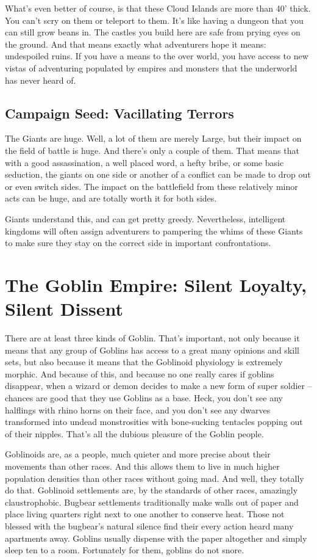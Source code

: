 What's even better of course, is that these Cloud Islands are more than 40' thick. You can't scry on them or teleport to them. It's like having a dungeon that you can still grow beans in. The castles you build here are safe from prying eyes on the ground. And that means exactly what adventurers hope it means: undespoiled ruins. If you have a means to the over world, you have access to new vistas of adventuring populated by empires and monsters that the underworld has never heard of.

\subsection{Campaign Seed: Vacillating Terrors}
The Giants are huge. Well, a lot of them are merely Large, but their impact on the field of battle is huge. And there's only a couple of them. That means that with a good assassination, a well placed word, a hefty bribe, or some basic seduction, the giants on one side or another of a conflict can be made to drop out or even switch sides. The impact on the battlefield from these relatively minor acts can be huge, and are totally worth it for both sides.

Giants understand this, and can get pretty greedy. Nevertheless, intelligent kingdoms will often assign adventurers to pampering the whims of these Giants to make sure they stay on the correct side in important confrontations.

\section{The Goblin Empire: Silent Loyalty, Silent Dissent}

There are at least three kinds of Goblin. That's important, not only because it means that any group of Goblins has access to a great many opinions and skill sets, but also because it means that the Goblinoid physiology is extremely morphic. And because of this, and because no one really cares if goblins disappear, when a wizard or demon decides to make a new form of super soldier -- chances are good that they use Goblins as a base. Heck, you don't see any halflings with rhino horns on their face, and you don't see any dwarves transformed into undead monstrosities with bone-sucking tentacles popping out of their nipples. That's all the dubious pleasure of the Goblin people.

Goblinoids are, as a people, much quieter and more precise about their movements than other races. And this allows them to live in much higher population densities than other races without going mad. And well, they totally do that. Goblinoid settlements are, by the standards of other races, amazingly claustrophobic. Bugbear settlements traditionally make walls out of paper and place living quarters right next to one another to conserve heat. Those not blessed with the bugbear's natural silence find their every action heard many apartments away. Goblins usually dispense with the paper altogether and simply sleep ten to a room. Fortunately for them, goblins do not snore.

